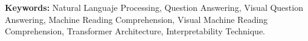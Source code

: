 \textbf{Keywords:} Natural Languaje Processing, Question Answering, Visual Question Answering, Machine Reading Comprehension, Visual Machine Reading Comprehension, Transformer Architecture, Interpretability Technique.


